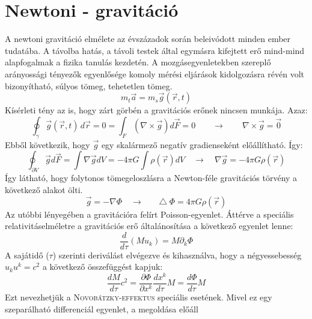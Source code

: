 \documentclass[a4paper, 12pt]{article}
\newcommand*\Laplace{\mathop{}\!\mathbin\bigtriangleup}
\begin{document}
\section{Newtoni - gravitáció}
A newtoni gravitáció elmélete az évszázadok során beleivódott minden ember tudatába. A távolba hatás, a távoli testek által egymásra kifejtett erő mind-mind alapfogalmak a fizika tanulás kezdetén. \newline
A mozgásegyenletekben szereplő arányossági tényezők egyenlősége komoly mérési eljárások kidolgozásra révén volt bizonyítható, súlyos tömeg, tehetetlen tömeg.
\begin{equation*}
m_{t}\vec{a} = m_{s}\vec{g}(\vec{r},t)
\end{equation*}
Kísérleti tény az is, hogy zárt görbén a gravitációs erőnek nincsen munkája. Azaz:
\begin{equation*}
\oint_\gamma \vec{g}(\vec{r},t) \,d\vec{r} = 0 = \int_F (\nabla \times \vec{g}) d\vec{F} = 0 \quad \quad \rightarrow \quad \quad \nabla \times \vec{g} = \vec{0}
\end{equation*}
Ebből következik, hogy $\vec{g}$ egy skalármező negatív gradienseként előállítható. Így:
\begin{equation*}
\oint_{\partial V} \vec{g} d\vec{F} = \int  \nabla\vec{g}dV = - 4\pi G \int \rho(\vec{r})dV \quad \rightarrow \quad \nabla\vec{g} = -4\pi G\rho(\vec{r})
\end{equation*}
Így látható, hogy folytonos tömegeloszlásra a Newton-féle gravitációs törvény a következő alakot ölti.
\begin{equation*}
\vec{g} = -\nabla\Phi \quad \rightarrow \quad \Laplace\Phi = 4\pi G \rho(\vec{r})
\end{equation*}
Az utóbbi lényegében a gravitációra felírt Poisson-egyenlet. \newline
\hspace{0.5cm} Áttérve a speciális relativitáselméletre a gravitációs erő általánosítása a következő egyenlet lenne:
\begin{equation*}
\frac{d}{d\tau}(Mu_{k}) = M \partial_{k}\Phi
\end{equation*}
A sajátidő ($\tau$) szerinti deriválást elvégezve és kihasználva, hogy a négyessebesség $u_{k}u^{k} = c^{2}$ a következő összefüggést kapjuk:
\begin{equation*}
\frac{dM}{d\tau}c^{2} = \frac{\partial \Phi}{\partial x^{k}} \frac{dx^{k}}{d\tau}M = \frac{d\Phi}{d\tau}M
\end{equation*}
Ezt nevezhetjük a \textsc{Novobátzky-effektus}  speciális esetének. Mivel ez egy szeparálható differenciál egyenlet, a megoldása előáll
\end{document}
